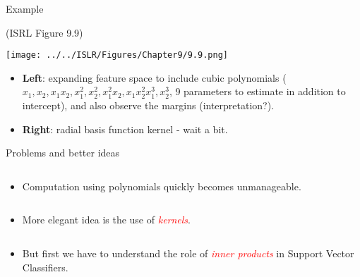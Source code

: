 \documentclass[10pt,ignorenonframetext,]{beamer}
\providecommand{\tightlist}{%
  \setlength{\itemsep}{0pt}\setlength{\parskip}{0pt}}
\begin{document}
\begin{frame}

\begin{block}{Example}

(ISRL Figure 9.9)

\centering

\texttt{[image: ../../ISLR/Figures/Chapter9/9.9.png]}

\flushleft

\vspace{2mm}

\begin{itemize}
\item
  \textbf{Left}: expanding feature space to include cubic polynomials
  (\(x_1,x_2,x_1x_2,x_1^2,x_2^2,x_1^2x_2,x_1x_2^2x_1^3,x_2^3\), 9
  parameters to estimate in addition to intercept), and also observe the
  margins (interpretation?).
\item
  \textbf{Right}: radial basis function kernel - wait a bit.
\end{itemize}

\end{block}

\end{frame}

\begin{frame}

\begin{block}{Problems and better ideas}

\(~\)

\begin{itemize}
\tightlist
\item
  Computation using polynomials quickly becomes unmanageable.
\end{itemize}

\(~\)

\begin{itemize}
\tightlist
\item
  More elegant idea is the use of \emph{\textcolor{red}{kernels}}.
\end{itemize}

\(~\)

\begin{itemize}
\tightlist
\item
  But first we have to understand the role of
  \emph{\textcolor{red}{inner products}} in Support Vector Classifiers.
\end{itemize}

\end{block}

\end{frame}
\end{document}
